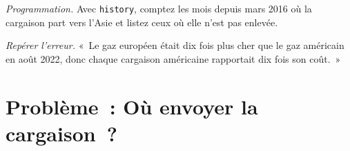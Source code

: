 \begin{exercise}[$\star\star\star$]\label{exo:m3:natural-gas-and-lng:7}
\emph{Programmation.} Avec \texttt{history}, comptez les mois depuis mars 2016 où
la cargaison part vers l'Asie et listez ceux où elle n'est pas enlevée.
\end{exercise}

\begin{exercise}[$\star\star\star$]\label{exo:m3:natural-gas-and-lng:8}
\emph{Repérer l'erreur.} «~Le gaz européen était dix fois plus cher que le gaz américain en août 2022, donc
chaque cargaison américaine rapportait dix fois son coût.~»
\end{exercise}

\section{Problème~: Où envoyer la cargaison~?}

